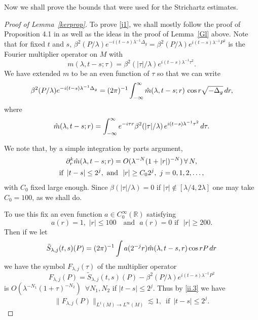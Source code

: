 \documentclass[10pt]{amsart}
\newcommand{\la}{\lambda}
\newcommand{\1}{{\bf 1}}
\newcommand{\R}{{\mathbb R}}
\begin{document}
Now we shall prove the bounds that were used for the Strichartz estimates.
\begin{proof}[Proof of Lemma~\ref{kerprop}]
    
To prove \eqref{j1}, we shall mostly follow the proof of Proposition 4.1 in \cite{blair2023strichartz} as well as the ideas in the proof of Lemma~\ref{Gl} above.  Note that for fixed $t$ and $s$,
$\beta^2(P/\la)e^{-i(t-s)\la^{-1}\Delta_g}=\beta^2(P/\la)e^{i(t-s)\la^{-1}P^2}$ is the  Fourier multiplier operator
on $M$ with
\begin{equation}\label{j2}
     m(\la,t-s;\tau)=\beta^2(|\tau|/\la)e^{i(t-s)\la^{-1}\tau^2}.
\end{equation}
We have extended $m$ to be an even function of $\tau$ so that we can write
\begin{equation}\label{j3}
\beta^2(P/\la)e^{-i(t-s)\la^{-1}\Delta_g}=(2\pi)^{-1}\int_{-\infty}^\infty 
\Hat m(\la,t-s;r) \, \cos r\sqrt{-\Delta_g} \, dr,
\end{equation}
where
\begin{equation}\label{j4}
\Hat m(\la,t-s;r)=\int_{-\infty}^\infty e^{-i\tau r}
\beta^2(|\tau|/\la) \, e^{i(t-s)\la^{-1}\tau^2} \, d\tau.
\end{equation}


We note that, by a simple integration by parts argument,
\begin{multline}\label{j6}
\partial^k_r \Hat m(\la,t-s;r)=O(\la^{-N}(1+|r|)^{-N}) \, \forall \, N, 
\\
 \text{if } \, |t-s|\le 2^j, \, \, \text{and } \, \, |r|\ge C_02^j, \, \, 
j=0,1, 2,\dots,
\end{multline}
with $C_0$ fixed large enough.  Since $\beta(|\tau|/\la)=0$ if $|\tau|\notin [\la/4,2\la]$ one may take 
$C_0=100$, as we shall do.


To use this fix an even function $a\in C^\infty_0(\R)$ satisfying
$$a(r)=1, \, \, |r|\le 100 \quad \text{and } \, \, a(r)=0\, \, \text{if } \, \,  |r|\ge200.$$
Then  if 
we let
\begin{equation}\label{j8}
\tilde S_{\la,j}(t,s)(P)=(2\pi)^{-1}\int a(2^{-j}r)\Hat m(\la,t-s,r) \cos rP\, dr
\end{equation}
we have the symbol $F_{\la,j}(\tau)$ of the multiplier operator $$F_{\la,j}(P)=\tilde S_{\la,j}(t,s)(P)-\beta^2(P/\la)e^{i(t-s)\la^{-1}P^2}$$ is $O(\la^{-N_1}(1+\tau)^{-N_2})\,\,\,\forall N_1, N_2$ if $ |t-s|\le 2^j$. Thus by \eqref{ii.3} we have $$\|F_{\la,j}(P)\|_{L^1(M)\to L^\infty (M)}\lesssim 1, \,\,\,\text{if}\,\,\, |t-s|\le 2^j.$$





\end{proof}
\end{document}
